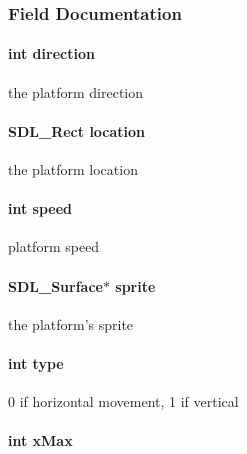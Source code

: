 \subsubsection{Field Documentation}
\hypertarget{structplatform_a886d551d5381dc3e53f17825ffc51641}{
\paragraph[{direction}]{\setlength{\rightskip}{0pt plus 5cm}int direction}}\label{structplatform_a886d551d5381dc3e53f17825ffc51641}
the platform direction \hypertarget{structplatform_a08e7ab1c2395b84bea7ca13eb99bac60}{
\paragraph[{location}]{\setlength{\rightskip}{0pt plus 5cm}S\-D\-L\-\_\-\-Rect location}}\label{structplatform_a08e7ab1c2395b84bea7ca13eb99bac60}
the platform location \hypertarget{structplatform_a218b4f7c6cc2681a99c23a3b089d68b1}{
\paragraph[{speed}]{\setlength{\rightskip}{0pt plus 5cm}int speed}}\label{structplatform_a218b4f7c6cc2681a99c23a3b089d68b1}
platform speed \hypertarget{structplatform_a1c7252614a33238e51edd3bbd5fa08c5}{
\paragraph[{sprite}]{\setlength{\rightskip}{0pt plus 5cm}S\-D\-L\-\_\-\-Surface$\ast$ sprite}}\label{structplatform_a1c7252614a33238e51edd3bbd5fa08c5}
the platform's sprite \hypertarget{structplatform_ac765329451135abec74c45e1897abf26}{
\paragraph[{type}]{\setlength{\rightskip}{0pt plus 5cm}int type}}\label{structplatform_ac765329451135abec74c45e1897abf26}
0 if horizontal movement, 1 if vertical \hypertarget{structplatform_af201ccbf3fe6a7e8274aa3eca22ac711}{
\paragraph[{x\-Max}]{\setlength{\rightskip}{0pt plus 5cm}int x\-Max}}\label{structplatform_af201ccbf3fe6a7e8274aa3eca22ac711}
